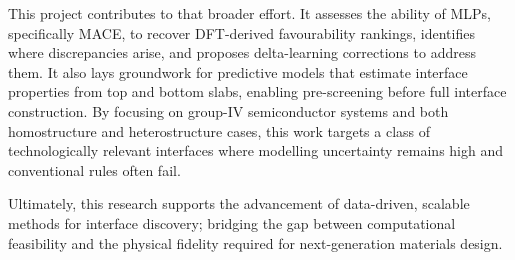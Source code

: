 This project contributes to that broader effort. It assesses the ability of MLPs, specifically MACE, to recover DFT-derived favourability rankings, identifies where discrepancies arise, and proposes delta-learning corrections to address them. It also lays groundwork for predictive models that estimate interface properties from top and bottom slabs, enabling pre-screening before full interface construction. By focusing on group-IV semiconductor systems and both homostructure and heterostructure cases, this work targets a class of technologically relevant interfaces where modelling uncertainty remains high and conventional rules often fail.

Ultimately, this research supports the advancement of data-driven, scalable methods for interface discovery; bridging the gap between computational feasibility and the physical fidelity required for next-generation materials design.